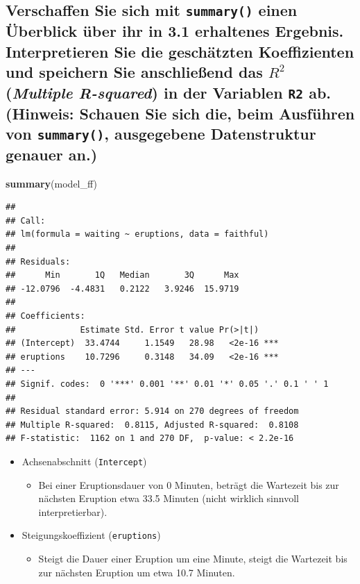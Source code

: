 \documentclass[12pt,a4paper]{article}
\newenvironment{Shaded}{\begin{snugshade}}{\end{snugshade}}
\newcommand{\FunctionTok}[1]{\textcolor[rgb]{0.13,0.29,0.53}{\textbf{#1}}}
\newcommand{\NormalTok}[1]{#1}
\begin{document}
\subsection{\texorpdfstring{Verschaffen Sie sich mit \texttt{summary()}
einen Überblick über ihr in 3.1 erhaltenes Ergebnis. Interpretieren Sie
die geschätzten Koeffizienten und speichern Sie anschließend das \(R^2\)
(\emph{Multiple R-squared}) in der Variablen \texttt{R2} ab. (Hinweis:
Schauen Sie sich die, beim Ausführen von \texttt{summary()}, ausgegebene
Datenstruktur genauer
an.)}{Verschaffen Sie sich mit summary() einen Überblick über ihr in 3.1 erhaltenes Ergebnis. Interpretieren Sie die geschätzten Koeffizienten und speichern Sie anschließend das R\^{}2 (Multiple R-squared) in der Variablen R2 ab. (Hinweis: Schauen Sie sich die, beim Ausführen von summary(), ausgegebene Datenstruktur genauer an.)}}\label{verschaffen-sie-sich-mit-summary-einen-uxfcberblick-uxfcber-ihr-in-3.1-erhaltenes-ergebnis.-interpretieren-sie-die-geschuxe4tzten-koeffizienten-und-speichern-sie-anschlieuxdfend-das-r2-multiple-r-squared-in-der-variablen-r2-ab.-hinweis-schauen-sie-sich-die-beim-ausfuxfchren-von-summary-ausgegebene-datenstruktur-genauer-an.}

\begin{Shaded}
\begin{Highlighting}[]
    \FunctionTok{summary}\NormalTok{(model\_ff)}
\end{Highlighting}
\end{Shaded}

\begin{verbatim}
## 
## Call:
## lm(formula = waiting ~ eruptions, data = faithful)
## 
## Residuals:
##      Min       1Q   Median       3Q      Max 
## -12.0796  -4.4831   0.2122   3.9246  15.9719 
## 
## Coefficients:
##             Estimate Std. Error t value Pr(>|t|)    
## (Intercept)  33.4744     1.1549   28.98   <2e-16 ***
## eruptions    10.7296     0.3148   34.09   <2e-16 ***
## ---
## Signif. codes:  0 '***' 0.001 '**' 0.01 '*' 0.05 '.' 0.1 ' ' 1
## 
## Residual standard error: 5.914 on 270 degrees of freedom
## Multiple R-squared:  0.8115, Adjusted R-squared:  0.8108 
## F-statistic:  1162 on 1 and 270 DF,  p-value: < 2.2e-16
\end{verbatim}

\begin{itemize}
  \item Achsenabschnitt (\texttt{Intercept})
  \begin{itemize}
    \item Bei einer Eruptionsdauer von 0 Minuten, beträgt die Wartezeit bis zur nächsten Eruption etwa 33.5 Minuten (nicht wirklich sinnvoll interpretierbar).
  \end{itemize}
  \item Steigungskoeffizient (\texttt{eruptions})
  \begin{itemize}
    \item Steigt die Dauer einer Eruption um eine Minute, steigt die Wartezeit bis zur nächsten Eruption um etwa 10.7 Minuten.
  \end{itemize}
\end{itemize}
\end{document}
